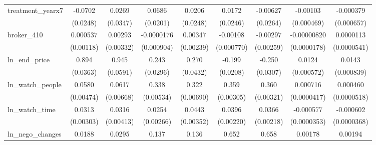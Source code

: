 {\begin{tabular}{l*{8}{c}}
\addlinespace
treatment\_yearx7&     -0.0702\sym{***}&      0.0269         &      0.0686\sym{***}&      0.0206         &      0.0172         &    -0.00627         &    -0.00103\sym{**} &   -0.000379         \\
            &    (0.0248)         &    (0.0347)         &    (0.0201)         &    (0.0248)         &    (0.0246)         &    (0.0264)         &  (0.000469)         &  (0.000657)         \\
\addlinespace
broker\_410  &    0.000537         &     0.00293         &  -0.0000176         &     0.00347         &    -0.00108         &    -0.00297         & -0.00000820         &   0.0000113         \\
            &   (0.00118)         &   (0.00332)         &  (0.000904)         &   (0.00239)         &  (0.000770)         &   (0.00259)         & (0.0000178)         & (0.0000541)         \\
\addlinespace
ln\_end\_price&       0.894\sym{***}&       0.945\sym{***}&       0.243\sym{***}&       0.270\sym{***}&      -0.199\sym{***}&      -0.250\sym{***}&      0.0124\sym{***}&      0.0143\sym{***}\\
            &    (0.0363)         &    (0.0591)         &    (0.0296)         &    (0.0432)         &    (0.0208)         &    (0.0307)         &  (0.000572)         &  (0.000839)         \\
\addlinespace
ln\_watch\_people&      0.0580\sym{***}&      0.0617\sym{***}&       0.338\sym{***}&       0.322\sym{***}&       0.359\sym{***}&       0.360\sym{***}&    0.000716\sym{***}&    0.000460\sym{***}\\
            &   (0.00474)         &   (0.00668)         &   (0.00534)         &   (0.00690)         &   (0.00305)         &   (0.00321)         & (0.0000417)         & (0.0000518)         \\
\addlinespace
ln\_watch\_time&      0.0313\sym{***}&      0.0316\sym{***}&      0.0254\sym{***}&      0.0443\sym{***}&      0.0396\sym{***}&      0.0366\sym{***}&   -0.000577\sym{***}&   -0.000602\sym{***}\\
            &   (0.00303)         &   (0.00413)         &   (0.00266)         &   (0.00352)         &   (0.00220)         &   (0.00218)         & (0.0000353)         & (0.0000368)         \\
\addlinespace
ln\_nego\_changes&      0.0188\sym{**} &      0.0295\sym{**} &       0.137\sym{***}&       0.136\sym{***}&       0.652\sym{***}&       0.658\sym{***}&     0.00178\sym{***}&     0.00194\sym{***}\\

\end{tabular}}
